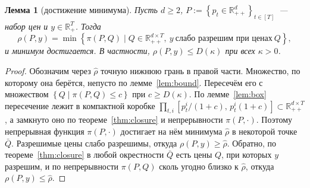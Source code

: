 \documentclass[a4paper,11pt]{article}
\theoremstyle{plain}
\newtheorem{lemma}[theorem]{Лемма}
\theoremstyle{definition}
\theoremstyle{remark}
\newcommand{\R}{\mathbb{R}}
\newcommand{\set}[1]{\left\{ #1 \right\}}
\newcommand{\Rpp}[1][2]{\R^{#1}_{++}} %
\newcommand{\Rp}[1][2]{\R^{#1}_{+}}   %
\begin{document}
\begin{lemma}[достижение минимума]\label{lem:min}
    Пусть $d\ge2$, $P:=\set{p_t\in\Rpp[d]}_{t\in[T]}$~--- набор цен и $y\in\Rp[T]$. Тогда
    \[
        \rho(P,y)=\min\set{\pi(P,Q)\mid Q\in\Rpp[d\times T],\ y\ \text{слабо разрешим при ценах}\ Q},
    \]
    и минимум достигается. В частности, $\rho(P,y)\le D(\kappa)$ при всех $\kappa>0$.
\end{lemma}

\begin{proof}
    Обозначим через $\widehat\rho$ точную нижнюю грань в правой части. Множество, по которому она берётся, непусто по лемме~\ref{lem:bound}. Пересечём его с множеством $\set{Q\mid\pi(P,Q)\le c}$ при $c\ge D(\kappa)$. По лемме~\ref{lem:box} пересечение лежит в компактной коробке $\prod_{t,i}[p^i_t/(1+c),\,p^i_t(1+c)]\subset\Rpp[d\times T]$, а замкнуто оно по теореме~\ref{thm:closure} и непрерывности $\pi(P,\cdot)$. Поэтому непрерывная функция $\pi(P,\cdot)$ достигает на нём минимума $\widehat\rho$ в некоторой точке $\bar Q$. Разрешимые цены слабо разрешимы, откуда $\rho(P,y)\ge\widehat\rho$. Обратно, по теореме~\ref{thm:closure} в любой окрестности $\bar Q$ есть цены $Q$, при которых $y$ разрешим, и по непрерывности $\pi(P,Q)$ сколь угодно близко к $\widehat\rho$, откуда $\rho(P,y)\le\widehat\rho$.
\end{proof}
\end{document}
